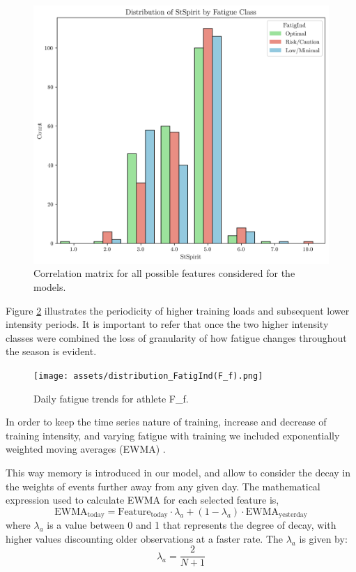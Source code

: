 \documentclass[conference]{IEEEtran}
\begin{document}
\begin{figure}[H]
    \centering
    \includegraphics[width=1\linewidth]{assets/distribution_StSpirit.png}
    \caption{Correlation matrix for all possible features considered for the models.}
    \label{distStSpirit}
\end{figure} %

Figure \ref{fatig_Ff} illustrates the periodicity of higher training loads and subsequent lower intensity periods. It is important to refer that once the two higher intensity classes were combined the loss of granularity of how fatigue changes throughout the season is evident.  
\begin{figure}[H]
    \centering
    \texttt{[image: assets/distribution\_FatigInd(F\_f).png]}
    \caption{Daily fatigue trends for athlete F\_f.}
    \label{fatig_Ff}
\end{figure} %

In order to keep the time series nature of training, increase and decrease of training intensity, and varying fatigue with training we included exponentially weighted moving averages (EWMA) \cite{Williams17}.

This way memory is introduced in our model, and allow to consider the decay in the weights of events further away from any given day. The mathematical expression used to calculate EWMA for each selected feature is,
\begin{equation*}
    \text{EWMA}_{\text{today}} = \text{Feature}_{\text{today}} \cdot \lambda_a + (1 - \lambda_a) \cdot \text{EWMA}_{\text{yesterday}}
\end{equation*}
where $\lambda_a$ is a value between 0 and 1 that represents the degree of decay, with higher values discounting older observations at a faster rate. The $\lambda_a$ is given by:
\begin{equation*}
    \lambda_a = \frac{2}{N + 1}
\end{equation*} 
\end{document}
